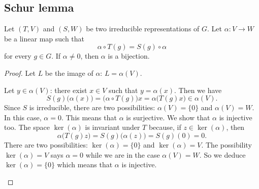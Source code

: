 \subsection{Schur lemma}

\begin{lemma}
	Let \( (T,V)\) and \( (S,W)\) be two irreducible representations of \( G\). Let \( \alpha\colon V\to W\) be a linear map such that
	\begin{equation}
		\alpha\circ T(g)=S(g)\circ \alpha
	\end{equation}
	for every \( g\in G\). If \( \alpha\neq 0\), then \( \alpha\) is a bijection.
\end{lemma}

\begin{proof}
	Let \( L\) be the image of \( \alpha\): \( L=\alpha(V)\).
	\begin{subproof}
		Let \( y\in \alpha(V)\): there exist \( x\in V\) such that \( y=\alpha(x)\). Then we have
		\begin{equation}
			S(g)\big( \alpha(x) \big)=\big( \alpha\circ T(g) \big)x=\alpha\big( T(g)x \big)\in \alpha(V).
		\end{equation}
		Since \( S\) is irreducible, there are two possibilities: \( \alpha(V)=\{ 0 \}\) and \( \alpha(V)=W\).
		\spitem[First: \( \alpha(V)=\{ 0 \}\)]
		In this case, \( \alpha=0\).
		\spitem[Second: \( \alpha(V)=W\)]
		This means that \( \alpha\) is surjective. We show that \( \alpha\) is injective too. The space \( \ker(\alpha)\) is invariant under \( T\) because, if \( z\in \ker(\alpha)\), then
		\begin{equation}
			\alpha\big( T(g)z \big)=S(g)\big( \alpha(z) \big)=S(g)(0)=0.
		\end{equation}
		There are two possibilities: \( \ker(\alpha)=\{ 0 \}\) and \( \ker(\alpha)=V\). The possibility \( \ker(\alpha)=V\) says \( \alpha=0\) while we are in the case \( \alpha(V)=W\). So we deduce \( \ker(\alpha)=\{ 0 \}\) which means that \( \alpha\) is injective.
	\end{subproof}
\end{proof}

